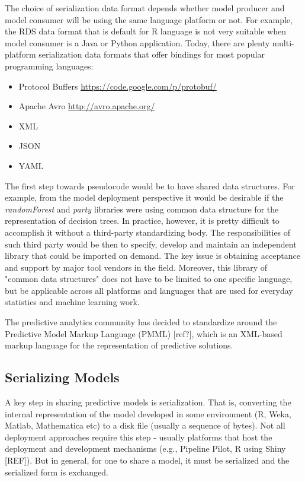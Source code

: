 \documentclass[12pt,letterpaper]{article}
\begin{document}
The choice of serialization data format depends whether model producer 
and model consumer will be using the same language platform or not. For
example, the RDS data format that is default for R language is not very
suitable when model consumer is a Java or Python application. Today,
there are plenty multi-platform serialization data formats that offer
bindings for most popular programming languages:
\begin{itemize}
  \item Protocol Buffers \url{https://code.google.com/p/protobuf/}
  \item Apache Avro \url{http://avro.apache.org/}
  \item XML
  \item JSON
  \item YAML
\end{itemize}

The first step towards pseudocode would be to have shared data structures.
For example, from the model deployment perspective it would be desirable
if the \textit{randomForest} and \textit{party} libraries were using common
data structure for the representation of decision trees. In practice,
however, it is pretty difficult to accomplish it without a third-party 
standardizing body. The responsibilities of such third party would be 
then to specify, develop and maintain an independent library that could
be imported on demand. The key issue is obtaining acceptance and support
by major tool vendors in the field. Moreover, this library of "common 
data structures" does not have to be limited to one specific language, but
be applicable across all platforms and languages that are used for
everyday statistics and machine learning work.

The predictive analytics community has decided to standardize around
the Predictive Model Markup Language (PMML) [ref?], which is an XML-based
markup language for the representation of predictive solutions. 

\subsection{Serializing Models}
\label{sec:serializing-models}

A key step in sharing predictive models is serialization. That is,
converting the internal representation of the model developed in some
environment (R, Weka, Matlab, Mathematica etc) to a disk file (usually
a sequence of bytes). Not all deployment approaches require this step
- usually platforms that host the deployment and development
mechanisms (e.g., Pipeline Pilot, R using Shiny [REF]). But in general, for one to share a
model, it must be serialized and the serialized form is exchanged.
\end{document}
